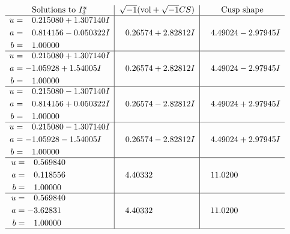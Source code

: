 \documentclass[1p]{elsarticle_modified}
\theoremstyle{definition}
\newcommand{\I}{\sqrt{-1}}
\begin{document}
$$\begin{array}{c|c|c}  
\text{Solutions to }I^u_{3}& \I (\text{vol} + \sqrt{-1}CS) & \text{Cusp shape}\\
 \hline 
\begin{aligned}
u &= \phantom{-}0.215080 + 1.307140 I \\
a &= \phantom{-}0.814156 - 0.050322 I \\
b &= \phantom{-}1.00000\phantom{ +0.000000I}\end{aligned}
 & \phantom{-}0.26574 + 2.82812 I & \phantom{-}4.49024 - 2.97945 I \\ \hline\begin{aligned}
u &= \phantom{-}0.215080 + 1.307140 I \\
a &= -1.05928 + 1.54005 I \\
b &= \phantom{-}1.00000\phantom{ +0.000000I}\end{aligned}
 & \phantom{-}0.26574 + 2.82812 I & \phantom{-}4.49024 - 2.97945 I \\ \hline\begin{aligned}
u &= \phantom{-}0.215080 - 1.307140 I \\
a &= \phantom{-}0.814156 + 0.050322 I \\
b &= \phantom{-}1.00000\phantom{ +0.000000I}\end{aligned}
 & \phantom{-}0.26574 - 2.82812 I & \phantom{-}4.49024 + 2.97945 I \\ \hline\begin{aligned}
u &= \phantom{-}0.215080 - 1.307140 I \\
a &= -1.05928 - 1.54005 I \\
b &= \phantom{-}1.00000\phantom{ +0.000000I}\end{aligned}
 & \phantom{-}0.26574 - 2.82812 I & \phantom{-}4.49024 + 2.97945 I \\ \hline\begin{aligned}
u &= \phantom{-}0.569840\phantom{ +0.000000I} \\
a &= \phantom{-}0.118556\phantom{ +0.000000I} \\
b &= \phantom{-}1.00000\phantom{ +0.000000I}\end{aligned}
 & \phantom{-}4.40332\phantom{ +0.000000I} & \phantom{-}11.0200\phantom{ +0.000000I} \\ \hline\begin{aligned}
u &= \phantom{-}0.569840\phantom{ +0.000000I} \\
a &= -3.62831\phantom{ +0.000000I} \\
b &= \phantom{-}1.00000\phantom{ +0.000000I}\end{aligned}
 & \phantom{-}4.40332\phantom{ +0.000000I} & \phantom{-}11.0200\phantom{ +0.000000I}\\
 \hline 
 \end{array}$$\newpage
\end{document}
